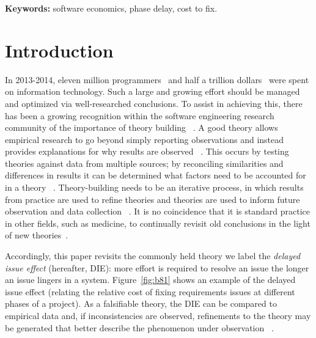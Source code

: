 \documentclass[smallcondensed]{svjour3}
\newcommand{\fig}[1]{Figure~\ref{fig:#1}}
\begin{document}
 

\vspace{1mm}
\noindent
{\bf Keywords:} software economics, phase delay, cost to fix.
  
\section{Introduction}
In 2013-2014, 
eleven  million programmers~\cite{avram14} and
half a trillion dollars~\cite{pettey14} were spent on information technology.
Such a large and growing effort should be managed and optimized via  well-researched conclusions.  
To assist in achieving this, there has been a growing recognition within the software engineering research community 
of the importance of theory building ~\cite{Sjoberg08, Paivarinta15, Stol15}. A good theory allows empirical research to go beyond simply
reporting observations and instead provides explanations for why results are observed ~\cite{Stol15}. This occurs by testing theories against data from multiple sources; by reconciling similarities and differences in results it can be determined what factors need to be accounted for in a theory ~\cite{Shull08}. Theory-building needs to be an iterative process,
in which results from practice are used to refine theories and theories are used to inform future observation and data collection ~\cite{Paivarinta15, Stol15}. It is no coincidence that it is standard practice
in other fields, such as medicine,
to continually revisit old conclusions in the light of new theories~\cite{prasad13}.


Accordingly, this paper revisits
the commonly held theory we label the {\em delayed issue effect} (hereafter, DIE):
more effort is required to resolve an issue the longer an issue lingers in a system.
 \fig{b81} shows an example of the delayed issue effect (relating
 the relative cost of fixing requirements issues at different phases of a project). As a falsifiable theory, the DIE can be compared to empirical data and, if inconsistencies are observed, refinements to the theory may be generated that better describe the phenomenon under observation ~\cite{Popper}.
 
\end{document}
